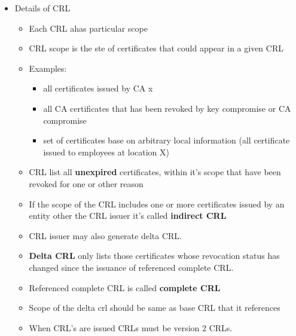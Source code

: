 \documentclass[a4paper]{article}
\begin{document}
        \begin{itemize}
            \item Details of CRL
            \begin{itemize}
                \item Each CRL ahas particular scope
                \item CRL scope is the ste of certificates that could appear in a given CRL
                \item Examples:
                    \begin{itemize}
                        \item all certificates issued by CA x
                        \item all CA certificates that has been revoked by key compromise or CA compromise
                        \item set of certificates base on arbitrary local information (all certificate issued to employees at location X)
                     \end{itemize}
                \item CRL list all \textbf{unexpired} certificates, within it's scope that have been revoked for one or other reason
                \item If the scope of the CRL includes one or more certificates issued by an entity other the CRL issuer it's called \textbf{indirect CRL}
                \item CRL issuer may also generate delta CRL. 
                \item \textbf{Delta CRL} only lists those certificates whose revocation status has changed since the issuance of referenced complete CRL.
                \item Referenced complete CRL is called \textbf{complete CRL}
                \item Scope of the delta crl should be same as base CRL that it references
                \item When CRL's are issued CRLs must be version 2 CRLs. 
            \end{itemize}
        \end{itemize}
\end{document}
